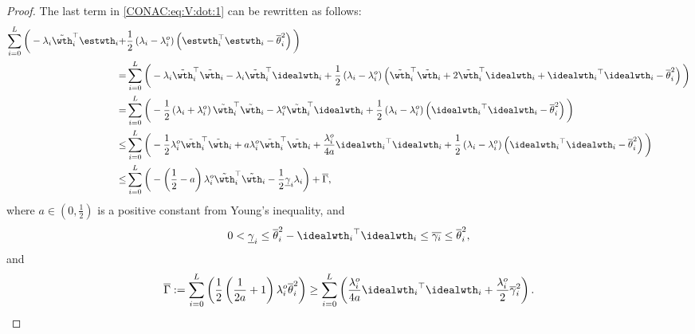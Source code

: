 \begin{proof}
The last term in \eqref{CONAC:eq:V:dot:1} can be rewritten as follows:
\begin{align} \label{CONAC:eq:V:dot:1:1}
  \sum_{i=0}^L
  \bigg(
    -
    \lambda_i
    \tilde{\wth}_i^\top
    \estwth_i
    +
    &
    \frac{1}{2}
    \left(
      \lambda_i - \lambda_i^o 
    \right)
    \left(
      \estwth_i^\top
      \estwth_i
      -
      \overline{\theta}_i^2
    \right)
  \bigg)
  \\ \nonumber
  =
  &
  \sum_{i=0}^L
  \bigg(
    -
    \lambda_i
    \tilde{\wth}_i^\top
    \tilde{\wth}_i
    -
    \lambda_i
    \tilde{\wth}_i^\top
    \idealwth_i
    +
    \frac{1}{2}
    \left(
      \lambda_i - \lambda_i^o
    \right)
    \left(
      \tilde{\wth}_i^\top
      \tilde{\wth}_i
      +
      2\tilde{\wth}_i^\top
      \idealwth_i
      +
      {\idealwth_i}^\top
      \idealwth_i
      -
      \overline{\theta}_i^2
    \right)
  \bigg)
  \\ \nonumber
  =
  &
  \sum_{i=0}^L
  \bigg(
    -
    \frac{1}{2}
    \left(
      \lambda_i
      +
      \lambda_i^o
    \right)
    \tilde{\wth}_i^\top
    \tilde{\wth}_i
    -
    \lambda_i^o
    \tilde{\wth}_i^\top
    \idealwth_i
    +
    \frac{1}{2}
    \left(
      \lambda_i - \lambda_i^o
    \right)
    \left(
      {\idealwth_i}^\top
      \idealwth_i
      -
      \overline{\theta}_i^2
    \right)
  \bigg)
  \\ \nonumber
  \le &
  \sum_{i=0}^L
  \bigg(
    -
    \frac{1}{2}
    \lambda_i^o
    \tilde{\wth}_i^\top
    \tilde{\wth}_i
    +
    a \lambda_i^o
    \tilde{\wth}_i^\top
    \tilde{\wth}_i
    +
    \frac{\lambda_i^o}{4a}
    {\idealwth_i}^\top
    \idealwth_i
    +
    \frac{1}{2}
    \left(
      \lambda_i - \lambda_i^o
    \right)
    \left(
      {\idealwth_i}^\top
      \idealwth_i
      -
      \overline{\theta}_i^2
    \right)
  \bigg)
  \\ \nonumber
  \le &
  \sum_{i=0}^L
  \bigg(
    -
    \left(
      \frac{1}{2}
      -
      a
    \right)
    \lambda_i^o
    \tilde{\wth}_i^\top
    \tilde{\wth}_i
    -
    \frac{1}{2}
    \underline{\gamma}_i
    \lambda_i
  \bigg)
  +
  \overline{\Gamma}
  ,
\end{align}
where $a\in(0,\tfrac{1}{2})$ is a positive constant from Young's inequality, and 
\begin{equation}
  0<
  \underline{\gamma}_i
  \le
  \overline{\theta}_i^2
  -
  {\idealwth_i}^\top\idealwth_i
  \le
  \overline{\gamma_i}
  \le
  \overline{\theta}_i^2
  ,
\end{equation}
and
\begin{equation}
  \overline{\Gamma}
  :=
  \sum_{i=0}^L
  \left(
    \frac{1}{2}
    \left(
      \frac{1}{2a}+1
    \right)
    \lambda_i^o
    \overline{\theta}_i^2
  \right)
  \ge
  \sum_{i=0}^L
  \left(
    \frac{\lambda_i^o}{4a}
    {\idealwth_i}^{\top}\idealwth_i
    +
    \frac{\lambda_i^o}{2}
    \overline{\gamma}_i^2
  \right)
  .
\end{equation}


\end{proof}
